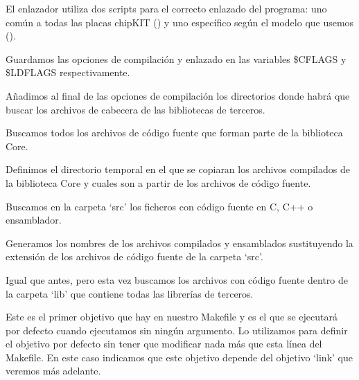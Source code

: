  
 El enlazador utiliza dos scripts para el correcto enlazado del programa: uno común a todas las placas chipKIT () y uno específico según el modelo que usemos ().
 
 
 Guardamos las opciones de compilación y enlazado en las variables \$CFLAGS y \$LDFLAGS respectivamente.
 
 
 Añadimos al final de las opciones de compilación los directorios donde habrá que buscar los archivos de cabecera de las bibliotecas de terceros.


Buscamos todos los archivos de código fuente que forman parte de la biblioteca Core.
 

 Definimos el directorio temporal en el que se copiaran los archivos compilados de la biblioteca Core y cuales son a partir de los archivos de código fuente.
 
 
 Buscamos en la carpeta `src' los ficheros con código fuente en C, C++ o ensamblador.

 
 Generamos los nombres de los archivos compilados y ensamblados sustituyendo la extensión de los archivos de código fuente de la carpeta `src'.
 
 
 Igual que antes, pero esta vez buscamos los archivos con código fuente dentro de la carpeta `lib' que contiene todas las librerías de terceros.
 
 
 Este es el primer objetivo que hay en nuestro Makefile y es el que se ejecutará por defecto cuando ejecutamos  sin ningún argumento. Lo utilizamos para definir el objetivo por defecto sin tener que modificar nada más que esta línea del Makefile. En este caso indicamos que este objetivo depende del objetivo `link' que veremos más adelante.
 
